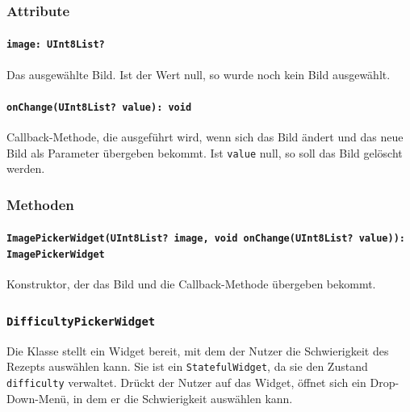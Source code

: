 \documentclass{entwurfsheft}
\begin{document}
\begin{sloppypar}
\subsubsection*{Attribute}
\paragraph{\texttt{image: UInt8List?}}
Das ausgewählte Bild. Ist der Wert null, so wurde noch kein Bild ausgewählt.
\paragraph{\texttt{onChange(UInt8List? value): void}}
Callback-Methode, die ausgeführt wird, wenn sich das Bild ändert und das neue Bild als Parameter übergeben bekommt. Ist \texttt{value} null, so soll das Bild gelöscht werden.
\subsubsection*{Methoden}
\paragraph{\texttt{ImagePickerWidget(UInt8List? image, void onChange(UInt8List? value)): ImagePickerWidget}}
Konstruktor, der das Bild und die Callback-Methode übergeben bekommt.
\newpage

\subsubsection{\texttt{DifficultyPickerWidget}}
\label{sec:difficultyPickerWidget}
Die Klasse stellt ein Widget bereit, mit dem der Nutzer die Schwierigkeit des Rezepts auswählen kann. Sie ist ein \texttt{StatefulWidget}, da sie den Zustand \texttt{difficulty} verwaltet. Drückt der Nutzer auf das Widget, öffnet sich ein Drop-Down-Menü, in dem er die Schwierigkeit auswählen kann. 


\end{sloppypar}
\end{document}
